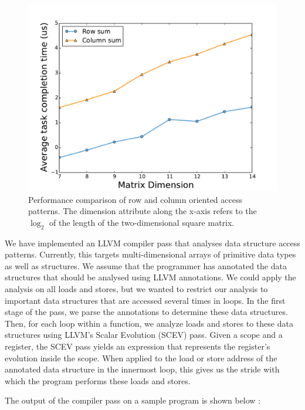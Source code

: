 \documentclass[letterpaper]{article}
\begin{document}
\begin{figure}[ht]
	\centering
	\includegraphics[scale=0.35]{images/rowmajor}
	\caption{Performance comparison of row and column oriented access patterns.
	The dimension attribute along the x-axis refers to the $\log_2$ of the length of the two-dimensional square matrix. }
	\label{fig:perf}
\end{figure}

We have implemented an LLVM compiler pass that analyses data structure access patterns.
Currently, this targets multi-dimensional arrays of primitive data types as well as structures.
We assume that the programmer has annotated the data structures that should be
analysed using LLVM annotations.
We could apply the analysis on all loads and stores, but we wanted to restrict our
analysis to important data structures that are accessed several times in loops.
In the first stage of the pass, we parse the annotations to determine these data structures.
Then, for each loop within a function, we analyze loads and stores to these
data structures using LLVM's Scalar Evolution (SCEV) pass. Given a scope and a
register, the SCEV pass yields an expression that represents the register's
evolution inside the scope. When applied to the load or store address of the
annotated data structure in the innermost loop, this gives us the stride
with which the program performs these loads and stores.

The output of the compiler pass on a sample program is shown below :
\end{document}
